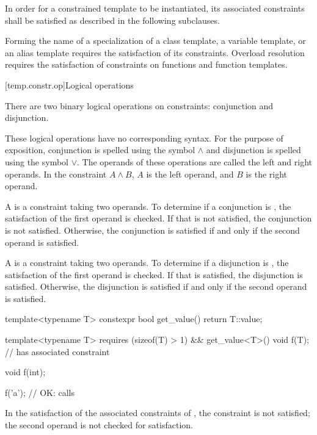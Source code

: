 \pnum
In order for a constrained template to be instantiated,
its associated constraints
shall be satisfied as described in the following subclauses.
\begin{note}
Forming the name of a specialization of
a class template,
a variable template, or
an alias template
requires the satisfaction of its constraints.
Overload resolution
requires the satisfaction of constraints
on functions and function templates.
\end{note}

[temp.constr.op]{Logical operations}

\pnum
There are two binary logical operations on constraints: conjunction
and disjunction.
\begin{note}
These logical operations have no corresponding \Cpp{} syntax.
For the purpose of exposition, conjunction is spelled
using the symbol $\land$ and disjunction is spelled using the
symbol $\lor$.
The operands of these operations are called the left
and right operands. In the constraint $A \land B$,
$A$ is the left operand, and $B$ is the right operand.
\end{note}

\pnum
A  is a constraint taking two
operands.
To determine if a conjunction is
,
the satisfaction of
the first operand is checked.
If that is not satisfied, the conjunction is not satisfied.
Otherwise, the conjunction is satisfied if and only if the second
operand is satisfied.

\pnum
A  is a constraint taking two
operands.
%
To determine if a disjunction is
,
the satisfaction of
the first operand is checked.
If that is satisfied, the disjunction is satisfied.
Otherwise, the disjunction is satisfied if and only if the second
operand is satisfied.

\pnum
\begin{example}
\begin{codeblock}
template<typename T>
  constexpr bool get_value() { return T::value; }

template<typename T>
  requires (sizeof(T) > 1) && get_value<T>()
    void f(T);      // has associated constraint 

void f(int);

f('a'); // OK: calls 
\end{codeblock}
In the satisfaction of the associated constraints
of , the constraint  is not satisfied;
the second operand is not checked for satisfaction.
\end{example}


